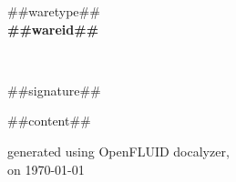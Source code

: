 \documentclass{##docstyle##}
\begin{document}
\begin{center}
  {##waretype##}\\
  \vspace{0.8em}
  {\huge \bfseries ##wareid##}\\
\end{center}\\
\vspace{1.5em}

##signature##

\vspace{1.5em}

\begin{multicols}{2}
##content##
\end{multicols}

\vspace{3em}

\small
\begin{flushright}generated using OpenFLUID docalyzer,\\
on \today\end{flushright}
\small
\end{document}
